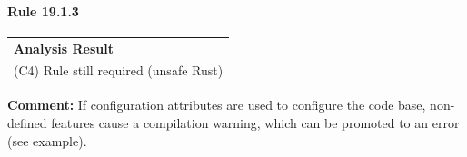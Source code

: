 \paragraph{Rule 19.1.3}
\begin{longtable}{p{13cm}}
\textbf{Analysis Result} \\
(C4) Rule still required (unsafe Rust) \\
\end{longtable}
\textbf{Comment:} If configuration attributes are used to configure the code base, non-defined features cause a compilation warning, which can be promoted to an error (see example). \\


